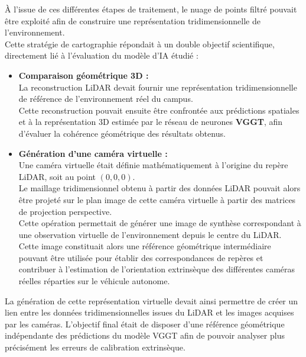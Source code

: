 \documentclass[12pt,a4paper,oneside]{report}
\begin{document}
\hspace*{.3cm}À l'issue de ces différentes étapes de traitement, le nuage de points filtré pouvait être exploité afin de construire une représentation tridimensionnelle de l'environnement.\\

\hspace*{.3cm}Cette stratégie de cartographie répondait à un double objectif scientifique, directement lié à l'évaluation du modèle d'IA étudié :

\begin{itemize}

\item \textbf{Comparaison géométrique 3D :}\\
La reconstruction LiDAR devait fournir une représentation tridimensionnelle de référence de l'environnement réel du campus.\\
Cette reconstruction pouvait ensuite être confrontée aux prédictions spatiales et à la représentation 3D estimée par le réseau de neurones \textbf{VGGT}, afin d'évaluer la cohérence géométrique des résultats obtenus.

\item \textbf{Génération d'une caméra virtuelle :}\\
Une caméra virtuelle était définie mathématiquement à l'origine du repère LiDAR, soit au point $(0,0,0)$.\\
Le maillage tridimensionnel obtenu à partir des données LiDAR pouvait alors être projeté sur le plan image de cette caméra virtuelle à partir des matrices de projection perspective.\\
Cette opération permettait de générer une image de synthèse correspondant à une observation virtuelle de l'environnement depuis le centre du LiDAR.\\
Cette image constituait alors une référence géométrique intermédiaire pouvant être utilisée pour établir des correspondances de repères et contribuer à l'estimation de l'orientation extrinsèque des différentes caméras réelles réparties sur le véhicule autonome.

\end{itemize}

\par\bigskip
\par\bigskip

\hspace*{0.3cm}La génération de cette représentation virtuelle devait ainsi permettre de créer un lien entre les données tridimensionnelles issues du LiDAR et les images acquises par les caméras. L'objectif final était de disposer d'une référence géométrique indépendante des prédictions du modèle VGGT afin de pouvoir analyser plus précisément les erreurs de calibration extrinsèque.
\end{document}
